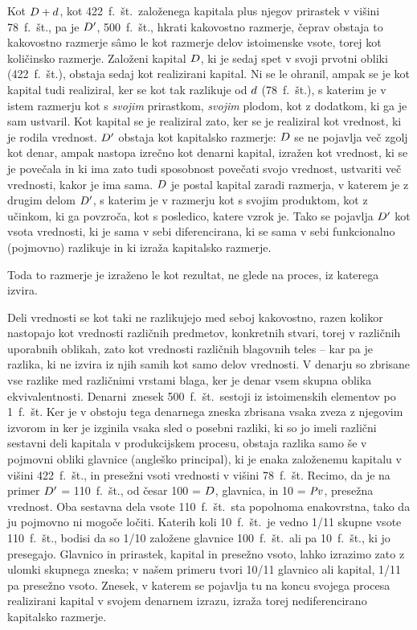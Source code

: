 \documentclass[kapital_02.tex]{subfiles}
\begin{document}
Kot \(D + d\), kot 422~f.~št.\ založenega kapitala plus njegov prirastek v višini 78~f.~št., pa je \(D'\), 500~f.~št., hkrati kakovostno razmerje, čeprav obstaja to kakovostno razmerje s\^amo le kot razmerje delov istoimenske vsote, torej kot količinsko razmerje. Založeni kapital \(D\), ki je sedaj spet v svoji prvotni obliki (422~f.~št.), obstaja sedaj kot realizirani kapital. Ni se le ohranil, ampak se je kot kapital tudi realiziral, ker se kot tak razlikuje od \(d\) (78~f.~št.), s katerim je v istem razmerju kot s \emph{svojim} prirastkom, \emph{svojim} plodom, kot z dodatkom, ki ga je sam ustvaril. Kot kapital se je realiziral zato, ker se je realiziral kot vrednost, ki je rodila vrednost. \(D'\) obstaja kot kapitalsko razmerje: \(D\) se ne pojavlja več zgolj kot denar, ampak nastopa izrečno kot denarni kapital, izražen kot vrednost, ki se je povečala in ki ima zato tudi sposobnost povečati svojo vrednost, ustvariti več vrednosti, kakor je ima sama. \(D\) je postal kapital zaradi razmerja, v katerem je z drugim delom \(D'\), s katerim je v razmerju kot s svojim produktom, kot z učinkom, ki ga povzroča, kot s posledico, katere vzrok je. Tako se pojavlja \(D'\) kot vsota vrednosti, ki je sama v sebi diferencirana, ki se sama v sebi funkcionalno (pojmovno) razlikuje in ki izraža kapitalsko razmerje.

Toda to razmerje je izraženo le kot rezultat, ne glede na proces, iz katerega izvira.

Deli vrednosti se kot taki ne razlikujejo med seboj kakovostno, razen kolikor nastopajo kot vrednosti različnih predmetov, konkretnih stvari, torej v različnih uporabnih oblikah, zato kot vrednosti različnih blagovnih teles -- kar pa je razlika, ki ne izvira iz njih samih kot samo delov vrednosti. V denarju so zbrisane vse razlike med različnimi vrstami blaga, ker je denar vsem skupna oblika ekvivalentnosti. Denarni\KPEstran\ znesek 500~f.~št.\ sestoji iz istoimenskih elementov po 1~f.~št. Ker je v obstoju tega denarnega zneska zbrisana vsaka zveza z njegovim izvorom in ker je izginila vsaka sled o posebni razliki, ki so jo imeli različni sestavni deli kapitala v produkcijskem procesu, obstaja razlika samo še v pojmovni obliki glavnice (angleško principal), ki je enaka založenemu kapitalu v višini 422~f.~št., in presežni vsoti vrednosti v višini 78~f.~št. Recimo, da je na primer \(D'\) = 110~f.~št., od česar 100 = \(D\), glavnica, in 10 = \(\mathit{Pv}\), presežna vrednost. Oba sestavna dela vsote 110~f.~št.\ sta popolnoma enakovrstna, tako da ju pojmovno ni mogoče ločiti. Katerih koli 10~f.~št.\ je vedno 1/11 skupne vsote 110~f.~št., bodisi da so 1/10 založene glavnice 100~f.~št.\ ali pa 10~f.~št., ki jo presegajo. Glavnico in prirastek, kapital in presežno vsoto, lahko izrazimo zato z ulomki skupnega zneska; v našem primeru tvori 10/11 glavnico ali kapital, 1/11 pa presežno vsoto. Znesek, v katerem se pojavlja tu na koncu svojega procesa realizirani kapital v svojem denarnem izrazu, izraža torej nediferencirano kapitalsko razmerje.
\end{document}
